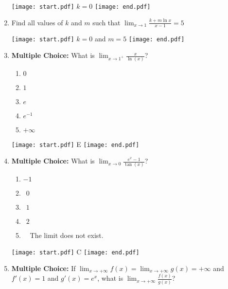 \documentclass[12pt]{article}
\begin{document}
\begin{enumerate}
\texttt{[image: start.pdf]}
{{$k=0$}}
\texttt{[image: end.pdf]}


\item Find all values of $k$ and $m$ such that $\lim_{x \rightarrow 1}{\frac{k+m\ln{x}}{x-1}}=5$

\texttt{[image: start.pdf]}
{{$k=0$ and $m=5$}}
\texttt{[image: end.pdf]}


\item {\bf Multiple Choice:} What is $\displaystyle \lim_{x\rightarrow 1^+} \frac{x}{\ln(x)}$?

\begin{enumerate}

\item $0$

\item $1$

\item $e$

\item $e^{-1}$

\item $+\infty$

\end{enumerate}

\texttt{[image: start.pdf]}
{{E}}
\texttt{[image: end.pdf]}


\newpage

\item {\bf Multiple Choice:} What is $\displaystyle \lim_{x\rightarrow 0}\frac{e^x-1}{\tan(x)}$?

\begin{enumerate}

\item $-1$

\item $\ \ 0$

\item $\ \ 1$

\item $\ \ 2$

\item \ \ The limit does not exist.

\end{enumerate}

\texttt{[image: start.pdf]}
{{C}}
\texttt{[image: end.pdf]}


\item {\bf Multiple Choice:} If $\displaystyle \lim_{x\rightarrow +\infty} f(x) =
\lim_{x\rightarrow +\infty} g(x) = +\infty$ and $f'(x)=1$ and $g'(x)=e^x$, what is 
$\displaystyle \lim_{x\rightarrow +\infty}\frac{f(x)}{g(x)}$?


\end{enumerate}
\end{document}
